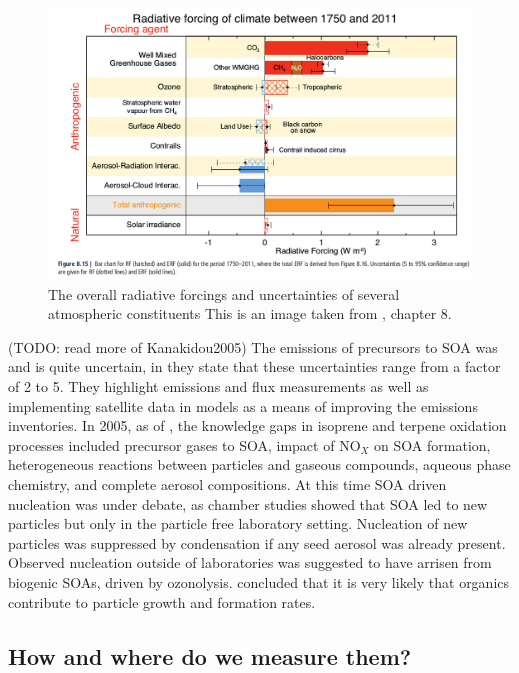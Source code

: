       \begin{figure}
        \includegraphics[width=\textwidth]{Figures/IPCC_WG1AR5_RFSummary.png}
        \caption{%
          The overall radiative forcings and uncertainties of several atmospheric constituents
  	      This is an image taken from \cite{IPCC_AR5_WG1}, chapter 8.}
        \label{LR:fig:IPCC_RF_AR5}
      \end{figure}    
      
      (TODO: read more of Kanakidou2005)
      The emissions of precursors to SOA was and is quite uncertain, in \cite{Kanakidou2005} they state that these uncertainties range from a factor of 2 to 5.
      They highlight emissions and flux measurements as well as implementing satellite data in models as a means of improving the emissions inventories.
      In 2005, as of \cite{Kanakidou2005}, the knowledge gaps in isoprene and terpene oxidation processes included precursor gases to SOA, impact of NO$_X$ on SOA formation, heterogeneous reactions between particles and gaseous compounds, aqueous phase chemistry, and complete aerosol compositions.
      At this time SOA driven nucleation was under debate, as chamber studies showed that SOA led to new particles but only in the particle free laboratory setting. 
      Nucleation of new particles was suppressed by condensation if any seed aerosol was already present.
      Observed nucleation outside of laboratories was suggested to have arrisen from biogenic SOAs, driven by ozonolysis.
      \cite{Kanakidou2005} concluded that it is very likely that organics contribute to particle growth and formation rates.
    
  \subsection{How and where do we measure them?}
  
